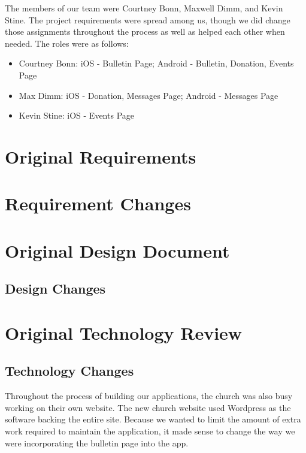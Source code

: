 \documentclass[letterpaper,10pt,draftclsnofoot,onecolumn,titlepage]{IEEEtran}
\begin{document}
The members of our team were Courtney Bonn, Maxwell Dimm, and Kevin Stine. 
The project requirements were spread among us, though we did change those assignments throughout the process as well as helped each other when needed. 
The roles were as follows: 

\begin{itemize}
	\item Courtney Bonn: iOS - Bulletin Page; Android - Bulletin, Donation, Events Page
	\item Max Dimm: iOS - Donation, Messages Page; Android - Messages Page
	\item Kevin Stine: iOS - Events Page
\end{itemize}

\section{Original Requirements}

	

\section{Requirement Changes}

\section{Original Design Document}

	
	
	\subsection{Design Changes}
	
\section{Original Technology Review}

	

	\subsection{Technology Changes}
	Throughout the process of building our applications, the church was also busy working on their own website. 
	The new church website used Wordpress as the software backing the entire site. 
	Because we wanted to limit the amount of extra work required to maintain the application, it made sense to change the way we were incorporating the bulletin page into the app. 
	
\end{document}

